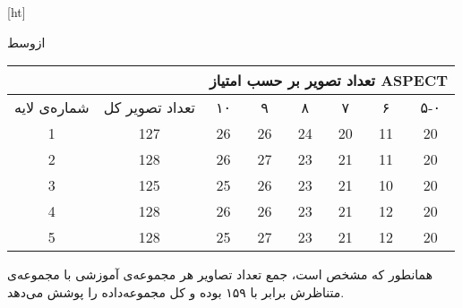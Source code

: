 [ht]

\vspace{1.5em}

‌ازوسط

\begin{tabular}{cccccccc}
    \cline{3-8}
                                                               &                                        & \multicolumn{6}{c}{تعداد تصویر بر حسب امتیاز ASPECT}                                                                                                                                                                             \\ \hline
     
    {شماره‌ی لایه} & تعداد تصویر کل & {۱۰} & {۹} & {۸} & {۷} & {۶} & ۵-۰ \\ \hline
    {1}                                    & 127                                    & {26}                         & {26}                        & {24}                        & {20}                        & {11}                        & 20  \\
    {2}                                    & 128                                    & {26}                         & {27}                        & {23}                        & {21}                        & {11}                        & 20  \\ 
    {3}                                    & 125                                    & {25}                         & {26}                        & {23}                        & {21}                        & {10}                        & 20  \\ 
    {4}                                    & 128                                    & {26}                         & {26}                        & {23}                        & {21}                        & {12}                        & 20  \\ 
    {5}                                    & 128                                    & {25}                         & {27}                        & {23}                        & {21}                        & {12}                        & 20  \\ \hline
    \end{tabular}


همانطور که مشخص است، جمع تعداد تصاویر هر مجموعه‌ی آموزشی با مجموعه‌ی متناظرش برابر با ۱۵۹ بوده و کل مجموعه‌داده را پوشش می‌دهد.

